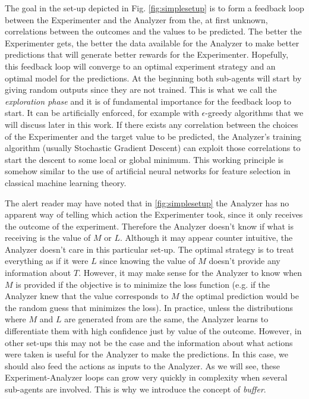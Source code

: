 \documentclass[11pt,a4paper,twoside]{report}
\newcommand{\+}{\textnormal{+} }
\theoremstyle{definition}
\numberwithin{equation}{chapter}
\begin{document}
The goal in the set-up depicted in Fig. \ref{fig:simplesetup} is to form a
feedback loop between the Experimenter and the Analyzer from the, at first
unknown, correlations between the outcomes and the values to be predicted. The
better the Experimenter gets, the better the data available for the Analyzer to
make better predictions that will generate better rewards for the Experimenter.
Hopefully, this feedback loop will converge to an optimal experiment strategy
and an optimal model for the predictions. At the beginning both sub-agents will
start by giving random outputs since they are not trained. This is what we call
the \textit{exploration phase} and it is of fundamental importance for the
feedback loop to start. It can be artificially enforced, for example with
$\epsilon$-greedy algorithms that we will discuss later in this work. If there
exists any correlation between the choices of the Experimenter and the target
value to be predicted, the Analyzer's training algorithm (usually Stochastic
Gradient Descent) can exploit those correlations to start the descent to some
local or global minimum. This working principle is somehow similar to the use of
artificial neural networks for feature selection in classical machine learning
theory.

The alert reader may have noted that in \ref{fig:simplesetup} the Analyzer has
no apparent way of telling which action the Experimenter took, since it only
receives the outcome of the experiment. Therefore the Analyzer doesn't know if
what is receiving is the value of $M$ or $L$. Although it may appear counter
intuitive, the Analyzer doesn't care in this particular set-up. The optimal
strategy is to treat everything as if it were $L$ since knowing the value of $M$
doesn't provide any information about $T$. However, it may make sense for the
Analyzer to know when $M$ is provided if the objective is to minimize the loss
function (e.g. if the Analyzer knew that the value corresponds to $M$ the
optimal prediction would be the random guess that minimizes the loss). In
practice, unless the distributions where $M$ and $L$ are generated from are the
same, the Analyzer learns to differentiate them with high confidence just by
value of the outcome. However, in other set-ups this may not be the case and the
information about what actions were taken is useful for the Analyzer to make the
predictions. In this case, we should also feed the actions as inputs to the
Analyzer. As we will see, these Experiment-Analyzer loops can grow very quickly
in complexity when several sub-agents are involved. This is why we introduce the
concept of \textit{buffer}.
\end{document}
